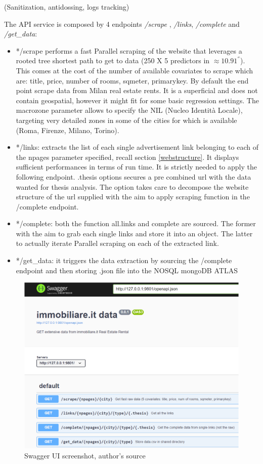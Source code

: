 \documentclass[
  12pt,
  a4paper,
  oneside]{book}
\theoremstyle{definition}
\theoremstyle{definition}
\theoremstyle{definition}
\theoremstyle{remark}
\begin{document}
(Sanitization, antidossing, logs tracking)

The API service is composed by 4 endpoints \emph{/scrape} , \emph{/links}, \emph{/complete} and \emph{/get\_data}:

\begin{itemize}
\item
  */scrape performs a fast Parallel scraping of the website that leverages a rooted tree shortest path to get to data (250 X 5 predictors in \(\approx 10.91^{''}\)). This comes at the cost of the number of available covariates to scrape which are: title, price, number of rooms, sqmeter, primarykey. By default the end point scrape data from Milan real estate rents. It is a superficial and does not contain geospatial, however it might fit for some basic regression settings. The macrozone parameter allows to specify the NIL (Nucleo Identità Locale), targeting very detailed zones in some of the cities for which is available (Roma, Firenze, Milano, Torino).
\item
  */links: extracts the list of each single advertisement link belonging to each of the npages parameter specified, recall section \ref{webstructure}. It displays sufficient performances in terms of run time. It is strictly needed to apply the following endpoint. .thesis options secures a pre combined url with the data wanted for thesis analysis. The option takes care to decompose the website structure of the url supplied with the aim to apply scraping function in the /complete endpoint.
\item
  */complete: both the function all.links and complete are sourced. The former with the aim to grab each single links and store it into an object. The latter to actually iterate Parallel scraping on each of the extracted link.
\item
  */get\_data: it triggers the data extraction by sourcing the /complete endpoint and then storing .json file into the NOSQL mongoDB ATLAS
\end{itemize}

\begin{figure}
\centering
\includegraphics{images/swagger.PNG}
\caption{Swagger UI screenshot, author's source}
\end{figure}
\end{document}
